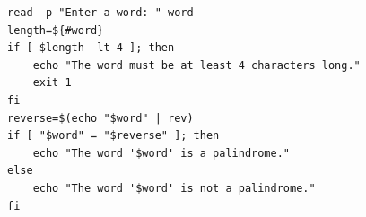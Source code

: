 \begin{verbatim}
read -p "Enter a word: " word
length=${#word}
if [ $length -lt 4 ]; then
    echo "The word must be at least 4 characters long."
    exit 1
fi
reverse=$(echo "$word" | rev)
if [ "$word" = "$reverse" ]; then
    echo "The word '$word' is a palindrome."
else
    echo "The word '$word' is not a palindrome."
fi
\end{verbatim}